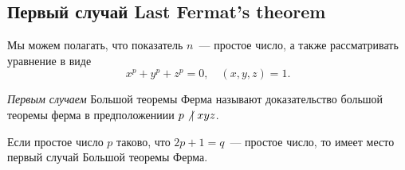 	
	\subsection{Первый случай Last Fermat's theorem}

	Мы можем полагать, что показатель $n$~--- простое число, а также рассматривать уравнение в виде 
	\begin{equation}
		x^p + y^p + z^p = 0, \quad (x, y, z) = 1. \label{1_st_Last_Fermat's_Theorem}
	\end{equation}
	
	\emph{Первым случаем} Большой теоремы Ферма называют доказательство большой теоремы ферма в предположениии $p \not \ \mid xyz$.  

	\begin{theorem} 
		Если простое число $p$ таково, что $2p + 1 = q$~--- простое число, то имеет место первый случай Большой теоремы Ферма. 
	\end{theorem}
